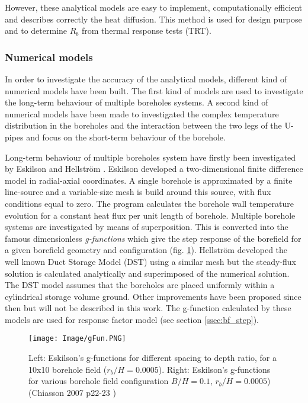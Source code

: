 \documentclass[a4paper,oneside,11pt]{report}
\begin{document}
However, these analytical models are easy to implement, computationally efficient and describes correctly the heat diffusion. This method is used for design purpose and to determine $R_b$ from thermal response tests (TRT).

\subsubsection*{Numerical models} \label{sssec:bf_LTR_num}

In order to investigate the accuracy of the analytical models, different kind of numerical models have been built. The first kind of models are used to investigate the long-term behaviour of multiple boreholes systems. A second kind of numerical models have been made to investigated the complex temperature distribution in the boreholes and the interaction between the two legs of the U-pipes and focus on the short-term behaviour of the borehole.

Long-term behaviour of multiple boreholes system have firstly been investigated by Eskilson and Hellstr\"om \cite{esk87, hel91}. Eskilson developed a two-dimensional finite difference model in radial-axial coordinates. A single borehole is approximated by a finite line-source and a variable-size mesh is build around this source, with flux conditions equal to zero. The program calculates the borehole wall temperature evolution for a constant heat flux per unit length of borehole. Multiple borehole systems are investigated by means of superposition. This is converted into the famous dimensionless \textit{g-functions} which give the step response of the borefield for a given borefield geometry and configuration (fig. \ref{fig:bf_gFun}). Hellstr\"om developed the well known Duct Storage Model (DST) using a similar mesh but the steady-flux solution is calculated analytically and superimposed of the numerical solution. The DST model assumes that the boreholes are placed uniformly within a cylindrical storage volume ground. Other improvements have been proposed since then but will not be described in this work. The g-function calculated by these models are used for response factor model (see section \ref{ssec:bf_step}).

\begin{figure}[hbtp]
\centering
\texttt{[image: Image/gFun.PNG]}
\caption{Left: Eskilson's g-functions for different spacing to depth ratio, for a 10x10 borehole field ($r_b/H=0.0005$). Right: Eskilson's g-functions for various borehole field configuration $B/H=0.1$, $r_b/H=0.0005$)(Chiasson 2007 p22-23 \cite{chi07})}
\label{fig:bf_gFun}
\end{figure}
\end{document}
